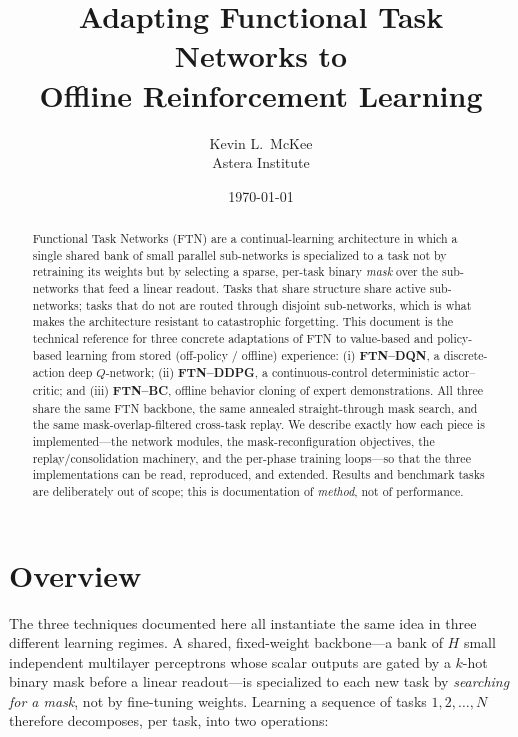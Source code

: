 \documentclass[11pt]{article}
\title{\bfseries Adapting Functional Task Networks to\\ Offline Reinforcement Learning}
\author{Kevin L.\ McKee\\ \normalsize Astera Institute}
\date{\today}
\newcommand{\Ho}{H}                        %
\newcommand{\kk}{k}                        %
\begin{document}
\maketitle

\begin{abstract}
Functional Task Networks (FTN) are a continual-learning architecture in which a
single shared bank of small parallel sub-networks is specialized to a task not by
retraining its weights but by selecting a sparse, per-task binary \emph{mask} over
the sub-networks that feed a linear readout. Tasks that share structure share
active sub-networks; tasks that do not are routed through disjoint sub-networks,
which is what makes the architecture resistant to catastrophic forgetting. This
document is the technical reference for three concrete adaptations of FTN to
value-based and policy-based learning from stored (off-policy / offline)
experience: (i) \textbf{FTN--DQN}, a discrete-action deep $Q$-network; (ii)
\textbf{FTN--DDPG}, a continuous-control deterministic actor--critic; and (iii)
\textbf{FTN--BC}, offline behavior cloning of expert demonstrations. All three
share the same FTN backbone, the same annealed straight-through mask search, and
the same mask-overlap-filtered cross-task replay. We describe exactly how each
piece is implemented---the network modules, the mask-reconfiguration objectives,
the replay/consolidation machinery, and the per-phase training loops---so that
the three implementations can be read, reproduced, and extended. Results and
benchmark tasks are deliberately out of scope; this is documentation of
\emph{method}, not of performance.
\end{abstract}

\tableofcontents

\section{Overview}

The three techniques documented here all instantiate the same idea in three
different learning regimes. A shared, fixed-weight backbone---a bank of $\Ho$
small independent multilayer perceptrons whose scalar outputs are gated by a
$\kk$-hot binary mask before a linear readout---is specialized to each new task by
\emph{searching for a mask}, not by fine-tuning weights. Learning a sequence of
tasks $1,2,\dots,N$ therefore decomposes, per task, into two operations:
\end{document}
